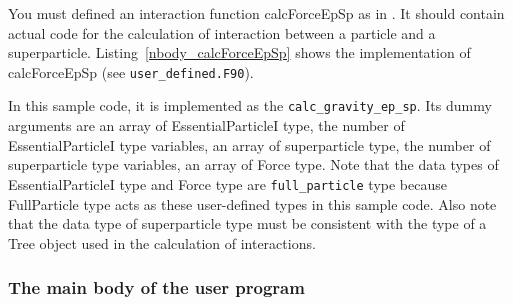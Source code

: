 \ifIF %
You must defined an interaction function \textsf{calcForceEpSp} as \procedure in \progLangName. It should contain actual code for the calculation of interaction between a particle and a superparticle. Listing~\ref{nbody_calcForceEpSp} shows the implementation of \textsf{calcForceEpSp} (see \texttt{user\_defined.F90}).

\ifFtn %

\endifFtn
\ifC %

\endifC

In this sample code, it is implemented as the \procedure \texttt{calc\_gravity\_ep\_sp}. Its dummy arguments are an array of \textsf{EssentialParticleI} type, the number of \textsf{EssentialParticleI} type variables, an array of superparticle type, the number of superparticle type variables, an array of \textsf{Force} type. Note that the data types of \textsf{EssentialParticleI} type and \textsf{Force type} are \texttt{full\_particle} type because \textsf{FullParticle} type acts as these user-defined types in this sample code. Also note that the data type of superparticle type must be consistent with the type of a \textsf{Tree} object used in the calculation of interactions.
\endifIF

\subsubsection{The main body of the user program}
\label{subsubsec:nbody_sample_main_part}

